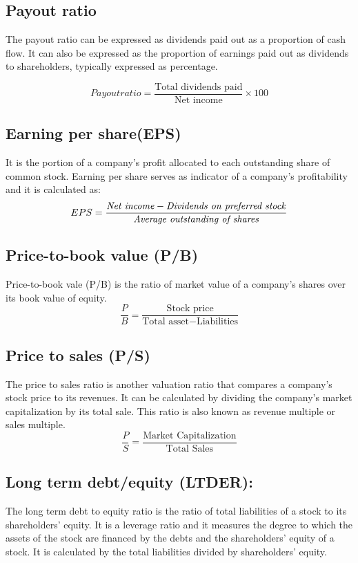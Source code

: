 \documentclass{ws-ijufks}
\begin{document}
\subsection*{Payout ratio}
The payout ratio can be expressed as dividends paid out as a proportion of cash flow. It 
can also be expressed as the proportion of earnings paid out as dividends to 
shareholders, typically expressed as percentage.

\begin{equation*}
Payout ratio=\frac{\textrm{Total dividends paid}}{\textrm{Net income}} \times 100
\end{equation*}

\subsection*{Earning per share(EPS)}
It is the portion of a company's profit allocated to each outstanding share of common 
stock. Earning per share serves as indicator of a company's profitability and it is 
calculated as:
\begin{equation*}
EPS=\frac{\text{\emph{Net income}}-\text{\emph{Dividends on preferred 
stock}}}{\text{\emph{Average outstanding of 
			shares}}}
\end{equation*} 

\subsection*{Price-to-book value (P/B)}
Price-to-book vale (P/B) is the ratio of market value of a company's shares over its book 
value of equity.
\begin{equation*}
\frac{P}{B}=\frac{\textrm{Stock price}}{\textrm{Total asset}-\textrm{Liabilities}}
\end{equation*}
\subsection*{Price to sales (P/S)}

The price to sales ratio is another valuation ratio that compares a company's stock price 
to its revenues. It can be calculated by dividing the company's market capitalization by 
its total sale. This ratio is also known as revenue multiple or sales multiple.
\begin{equation*}
\frac{P}{S}=\frac{\textrm{Market Capitalization}}{\textrm{Total Sales}}
\end{equation*}

\subsection*{Long term debt/equity (LTDER):}
The long term debt to equity ratio is the ratio of total liabilities of a stock to its 
shareholders' equity. It is a leverage ratio and it measures the degree to which the 
assets of the stock are financed by the debts and the shareholders' equity of a stock.  
It is calculated by the total liabilities divided by shareholders' equity.
\end{document}
